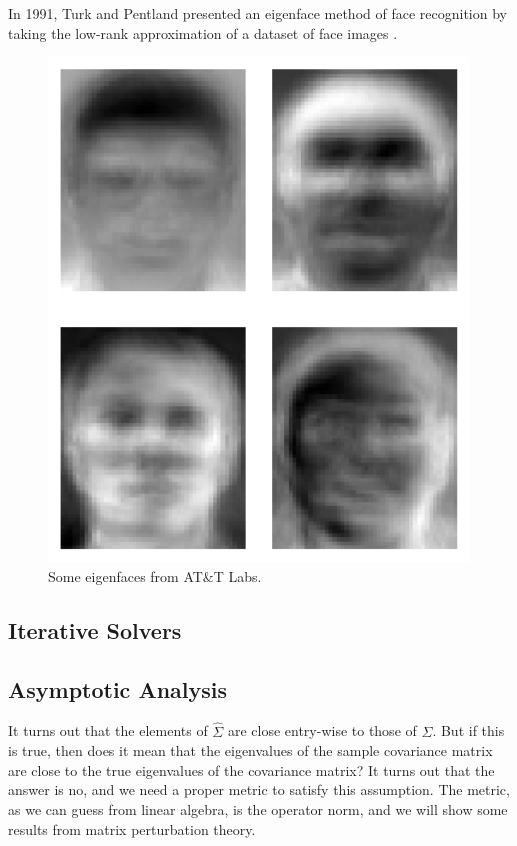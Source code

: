   \begin{example}[Eigenfaces]
    In 1991, Turk and Pentland presented an eigenface method of face recognition by taking the low-rank approximation of a dataset of face images \cite{1991turk}. 

    \begin{figure}[H]
      \centering 
      \includegraphics[scale=0.3]{img/eigenfaces.png}
      \caption{Some eigenfaces from AT\&T Labs. } 
      \label{fig:eigenfaces}
    \end{figure}
  \end{example}

\subsection{Iterative Solvers}

\subsection{Asymptotic Analysis}

  It turns out that the elements of $\hat{\Sigma}$ are close entry-wise to those of $\Sigma$. But if this is true, then does it mean that the eigenvalues of the sample covariance matrix are close to the true eigenvalues of the covariance matrix? It turns out that the answer is no, and we need a proper metric to satisfy this assumption. The metric, as we can guess from linear algebra, is the operator norm, and we will show some results from matrix perturbation theory. 

